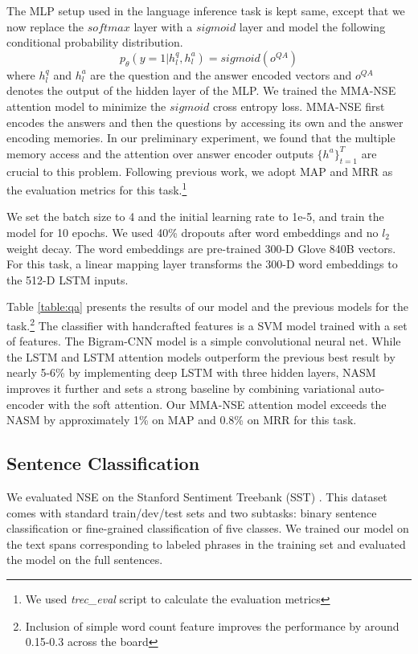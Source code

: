 \documentclass{article}
\begin{document}
The MLP setup used in the language inference task is kept same, except that we now replace the $softmax$ layer with a $sigmoid$ layer and model the following conditional probability distribution.
\begin{equation}
p_{\theta}(y=1|h^q_l,h^a_l) = sigmoid(o^{QA})
\end{equation}
where $h^q_l$ and $h^a_l$ are the question and the answer encoded vectors and $o^{QA}$ denotes the output of the hidden layer of the MLP. We trained the MMA-NSE attention model to minimize the $sigmoid$ cross entropy loss. MMA-NSE first encodes the answers and then the questions by accessing its own and the answer encoding memories. In our preliminary experiment, we found that the multiple memory access and the attention over answer encoder outputs  $\lbrace h^a \rbrace ^T_{t=1}$ are crucial to this problem. Following previous work, we adopt MAP and MRR as the evaluation metrics for this task.\footnote{We used \textit{trec\_eval} script to calculate the evaluation metrics}

We set the batch size to 4 and the initial learning rate to 1e-5, and train the model for 10 epochs. We used 40\% dropouts after word embeddings and no $l_2$ weight decay. The word embeddings are pre-trained 300-D Glove 840B vectors. For this task, a linear mapping layer transforms the 300-D word embeddings to the 512-D LSTM inputs.

Table \ref{table:qa} presents the results of our model and the previous models for the task.\footnote{Inclusion of simple word count feature improves the performance by around 0.15-0.3 across the board} The classifier with handcrafted features is a SVM model trained with a set of features. The Bigram-CNN model is a simple convolutional neural net. While the LSTM and LSTM attention models outperform the previous best result by nearly 5-6\% by implementing deep LSTM with three hidden layers, NASM improves it further and sets a strong baseline by combining variational auto-encoder \cite{kingma2014auto} with the soft attention. Our MMA-NSE attention model exceeds the NASM by approximately 1\% on MAP and 0.8\% on MRR for this task.

\subsection{Sentence Classification}

We evaluated NSE on the Stanford Sentiment Treebank (SST) \cite{socher2013recursive}. This dataset comes with standard train/dev/test sets and two subtasks: binary sentence classification or fine-grained classification of five classes. We trained our model on the text spans corresponding to labeled phrases in the training set and evaluated the model on the full sentences. 
\end{document}
